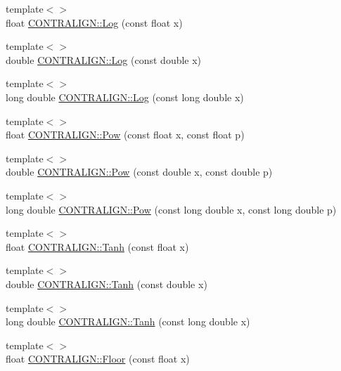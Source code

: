 \begin{DoxyCompactItemize}
\item 
{\footnotesize template$<$$>$ }\\float \hyperlink{namespace_c_o_n_t_r_a_l_i_g_n_a569ff2ac6f15afca32da99bc7c90a2ec}{C\+O\+N\+T\+R\+A\+L\+I\+G\+N\+::\+Log} (const float x)
\item 
{\footnotesize template$<$$>$ }\\double \hyperlink{namespace_c_o_n_t_r_a_l_i_g_n_a42c87473a0bb7acac9a2ec85b8170c48}{C\+O\+N\+T\+R\+A\+L\+I\+G\+N\+::\+Log} (const double x)
\item 
{\footnotesize template$<$$>$ }\\long double \hyperlink{namespace_c_o_n_t_r_a_l_i_g_n_a203566733c1db741c04c8ba43bfac9f2}{C\+O\+N\+T\+R\+A\+L\+I\+G\+N\+::\+Log} (const long double x)
\item 
{\footnotesize template$<$$>$ }\\float \hyperlink{namespace_c_o_n_t_r_a_l_i_g_n_a84be357ebad35b3bc5c1f868eae5a880}{C\+O\+N\+T\+R\+A\+L\+I\+G\+N\+::\+Pow} (const float x, const float p)
\item 
{\footnotesize template$<$$>$ }\\double \hyperlink{namespace_c_o_n_t_r_a_l_i_g_n_ab3f0a54836ccd297d5bbe337f191943a}{C\+O\+N\+T\+R\+A\+L\+I\+G\+N\+::\+Pow} (const double x, const double p)
\item 
{\footnotesize template$<$$>$ }\\long double \hyperlink{namespace_c_o_n_t_r_a_l_i_g_n_ae1f4a55e11316f304596d3a26869d375}{C\+O\+N\+T\+R\+A\+L\+I\+G\+N\+::\+Pow} (const long double x, const long double p)
\item 
{\footnotesize template$<$$>$ }\\float \hyperlink{namespace_c_o_n_t_r_a_l_i_g_n_acf91d891dabcc9c64740f9f97d3e30d1}{C\+O\+N\+T\+R\+A\+L\+I\+G\+N\+::\+Tanh} (const float x)
\item 
{\footnotesize template$<$$>$ }\\double \hyperlink{namespace_c_o_n_t_r_a_l_i_g_n_a647e44a28c6fa1922856f72076098ae4}{C\+O\+N\+T\+R\+A\+L\+I\+G\+N\+::\+Tanh} (const double x)
\item 
{\footnotesize template$<$$>$ }\\long double \hyperlink{namespace_c_o_n_t_r_a_l_i_g_n_aec2280338a362a451b5d959dc6e2fd97}{C\+O\+N\+T\+R\+A\+L\+I\+G\+N\+::\+Tanh} (const long double x)
\item 
{\footnotesize template$<$$>$ }\\float \hyperlink{namespace_c_o_n_t_r_a_l_i_g_n_a57c956df884afde3839cbcff1a8569a9}{C\+O\+N\+T\+R\+A\+L\+I\+G\+N\+::\+Floor} (const float x)

\end{DoxyCompactItemize}

